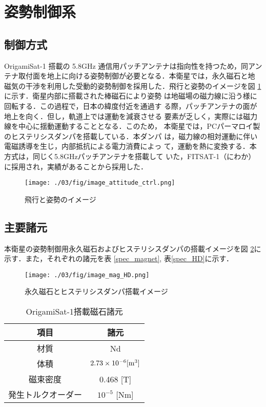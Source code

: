 \section{姿勢制御系}

\subsection{制御方式}
OrigamiSat-1 搭載の 5.8GHz 通信用パッチアンテナは指向性を持つため，同アン
テナ取付面を地上に向ける姿勢制御が必要となる．本衛星では，永久磁石と地
磁気の干渉を利用した受動的姿勢制御を採用した．飛行と姿勢のイメージを図
\ref{image_attitude_ctrl}に示す．衛星内部に搭載された棒磁石により姿勢
は地磁場の磁力線に沿う様に回転する．この過程で，日本の緯度付近を通過す
る際，パッチアンテナの面が地上を向く．但し，軌道上では運動を減衰させる
要素が乏しく，実際には磁力線を中心に揺動運動することとなる．このため，
本衛星では，PCパーマロイ製のヒステリシスダンパを搭載している．本ダンパ
は，磁力線の相対運動に伴い電磁誘導を生じ，内部抵抗による電力消費によっ
て，運動を熱に変換する．本方式は，同じく5.8GHzパッチアンテナを搭載して
いた，FITSAT-1（にわか）に採用され，実績があることから採用した．

\begin{figure}[htbp]
	\centering
	\texttt{[image: ./03/fig/image\_attitude\_ctrl.png]}
	\caption{飛行と姿勢のイメージ}
	\label{image_attitude_ctrl}
\end{figure}

\subsection{主要諸元}
本衛星の姿勢制御用永久磁石およびヒステリシスダンパの搭載イメージを図
\ref{image_mag_HD}に示す．また，それぞれの諸元を表
\ref{spec_magnet}, 表\ref{spec_HD}に示す．

\begin{figure}[htbp]
	\centering
	\texttt{[image: ./03/fig/image\_mag\_HD.png]}
	\caption{永久磁石とヒステリシスダンパ搭載イメージ}
	\label{image_mag_HD}
\end{figure}

\begin{table}[htb]
    \centering
    \caption{OrigamiSat-1搭載磁石諸元}
    \begin{tabular}{cc} \hline
      項目 & 諸元 \\ \hline\hline
      材質 & Nd \\
        体積 & $2.73 \times 10^{-6} [\rm{m^3}]$\\ 
        磁束密度 & 0.468 [T] \\ 
        発生トルクオーダー & $10^{-5}$ [Nm] \\ \hline   
    \end{tabular}
    \label{requirment_op}
\end{table}

